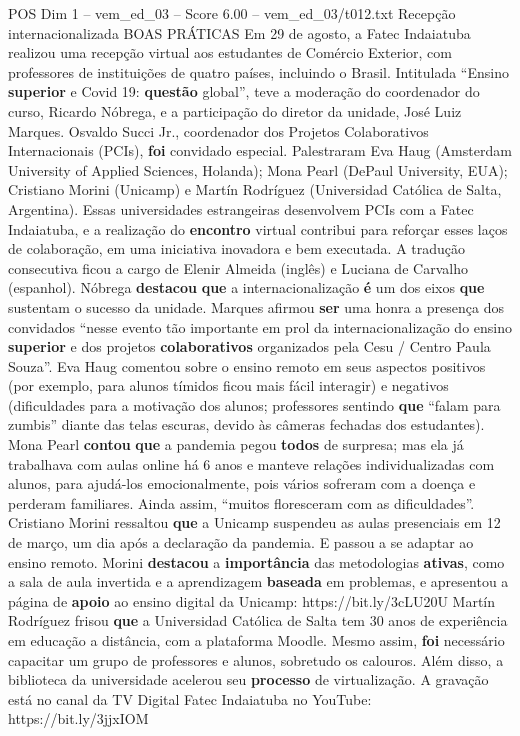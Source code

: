 \begin{textsample}{POS Dim 1 – vem\_ed\_03 – Score 6.00 – vem\_ed\_03/t012.txt}  \label{ex:f1_pos_159}
Recepção internacionalizada BOAS PRÁTICAS Em 29 de agosto, a Fatec Indaiatuba realizou uma recepção virtual aos estudantes de Comércio Exterior, com professores de instituições de quatro países, incluindo o Brasil.
Intitulada “Ensino \textbf{superior} e Covid 19: \textbf{questão} global”, teve a moderação do coordenador do curso, Ricardo Nóbrega, e a participação do diretor da unidade, José Luiz Marques.
Osvaldo Succi Jr., coordenador dos Projetos Colaborativos Internacionais (PCIs), \textbf{foi} convidado especial.
Palestraram Eva Haug (Amsterdam University of Applied Sciences, Holanda); Mona Pearl (DePaul University, EUA); Cristiano Morini (Unicamp) e Martín Rodríguez (Universidad Católica de Salta, Argentina).
Essas universidades estrangeiras desenvolvem PCIs com a Fatec Indaiatuba, e a realização do \textbf{encontro} virtual contribui para reforçar esses laços de colaboração, em uma iniciativa inovadora e bem executada.
A tradução consecutiva ficou a cargo de Elenir Almeida (inglês) e Luciana de Carvalho (espanhol).
Nóbrega \textbf{destacou} \textbf{que} a internacionalização \textbf{é} um dos eixos \textbf{que} sustentam o sucesso da unidade.
Marques afirmou \textbf{ser} uma honra a presença dos convidados “nesse evento tão importante em prol da internacionalização do ensino \textbf{superior} e dos projetos \textbf{colaborativos} organizados pela Cesu / Centro Paula Souza”.
Eva Haug comentou sobre o ensino remoto em seus aspectos positivos (por exemplo, para alunos tímidos ficou mais fácil interagir) e negativos (dificuldades para a motivação dos alunos; professores sentindo \textbf{que} “falam para zumbis” diante das telas escuras, devido às câmeras fechadas dos estudantes).
Mona Pearl \textbf{contou} \textbf{que} a pandemia pegou \textbf{todos} de surpresa; mas ela já trabalhava com aulas online há 6 anos e manteve relações individualizadas com alunos, para ajudá-los emocionalmente, pois vários sofreram com a doença e perderam familiares.
Ainda assim, “muitos floresceram com as dificuldades”.
Cristiano Morini ressaltou \textbf{que} a Unicamp suspendeu as aulas presenciais em 12 de março, um dia após a declaração da pandemia.
E passou a se adaptar ao ensino remoto.
Morini \textbf{destacou} a \textbf{importância} das metodologias \textbf{ativas}, como a sala de aula invertida e a aprendizagem \textbf{baseada} em problemas, e apresentou a página de \textbf{apoio} ao ensino digital da Unicamp: https://bit.ly/3cLU20U Martín Rodríguez frisou \textbf{que} a Universidad Católica de Salta tem 30 anos de experiência em educação a distância, com a plataforma Moodle.
Mesmo assim, \textbf{foi} necessário capacitar um grupo de professores e alunos, sobretudo os calouros.
Além disso, a biblioteca da universidade acelerou seu \textbf{processo} de virtualização.
A gravação está no canal da TV Digital Fatec Indaiatuba no YouTube: https://bit.ly/3jjxIOM

\end{textsample}
